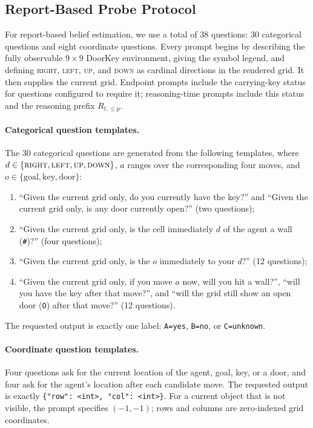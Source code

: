 \documentclass{article}
\begin{document}
\subsection{Report-Based Probe Protocol}
\label{app:report-protocol}

For report-based belief estimation, we use a total of 38 questions: 30 categorical questions and eight coordinate questions.
Every prompt begins by describing the fully observable $9\times9$ DoorKey environment, giving the symbol legend, and defining \textsc{right}, \textsc{left}, \textsc{up}, and \textsc{down} as cardinal directions in the rendered grid.
It then supplies the current grid.
Endpoint prompts include the carrying-key status for questions configured to require it; reasoning-time prompts include this status and the reasoning prefix $R_{t,\leq p}$.

\paragraph{Categorical question templates.}
The 30 categorical questions are generated from the following templates, where $d\in\{\textsc{right},\textsc{left},\textsc{up},\textsc{down}\}$, $a$ ranges over the corresponding four moves, and $o\in\{\text{goal},\text{key},\text{door}\}$:
\begin{enumerate}
    \item ``Given the current grid only, do you currently have the key?'' and ``Given the current grid only, is any door currently open?'' (two questions);
    \item ``Given the current grid only, is the cell immediately $d$ of the agent a wall (\texttt{\#})?'' (four questions);
    \item ``Given the current grid only, is the $o$ immediately to your $d$?'' (12 questions);
    \item ``Given the current grid only, if you move $a$ now, will you hit a wall?'', ``will you have the key after that move?'', and ``will the grid still show an open door (\texttt{O}) after that move?'' (12 questions).
\end{enumerate}
The requested output is exactly one label: \texttt{A=yes}, \texttt{B=no}, or \texttt{C=unknown}.

\paragraph{Coordinate question templates.}
Four questions ask for the current location of the agent, goal, key, or a door, and four ask for the agent's location after each candidate move.
The requested output is exactly \texttt{\{"row": <int>, "col": <int>\}}.
For a current object that is not visible, the prompt specifies $(-1,-1)$; rows and columns are zero-indexed grid coordinates.
\end{document}
